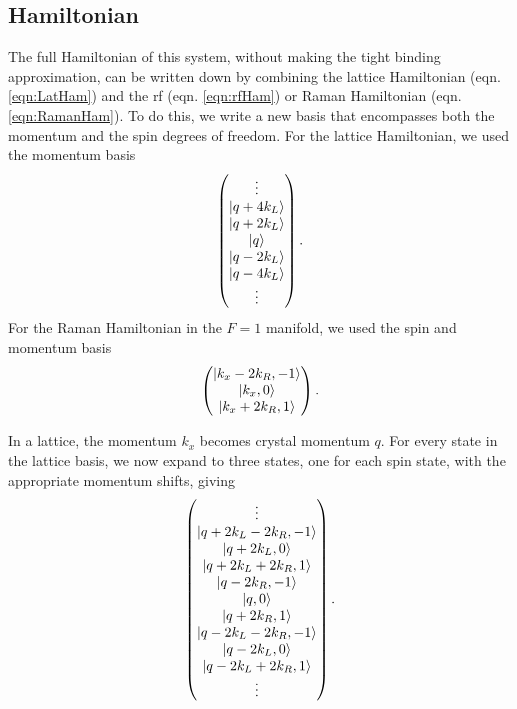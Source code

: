\subsection{Hamiltonian}\label{sec:SynDimHamiltonian}
The full Hamiltonian of this system, without making the tight binding approximation, can be written down by combining the lattice Hamiltonian (eqn. \ref{eqn:LatHam}) and the rf (eqn. \ref{eqn:rfHam}) or Raman Hamiltonian (eqn. \ref{eqn:RamanHam}). To do this, we write a new basis that encompasses both the momentum and the spin degrees of freedom. For the lattice Hamiltonian, we used the momentum basis
\begin{equation}
 \begin{pmatrix} \vdots \\
\mathinner{|{q+4 k_L}\rangle}\\
\mathinner{|{q+2 k_L}\rangle}\\
\mathinner{|{q}\rangle}\\
\mathinner{|{q -2 k_L}\rangle}\\
\mathinner{|{q - 4 k_L}\rangle}\\
\vdots
\end{pmatrix} \\.
\end{equation}
For the Raman Hamiltonian in the $F=1$ manifold, we used the spin and momentum basis
\begin{equation}
\begin{pmatrix}
\mathinner{|{k_x-2k_R,-1}\rangle}\\
 \mathinner{|{k_x,0}\rangle}\\
\mathinner{|{k_x+2k_R,1}\rangle}
\end{pmatrix}\\.
\end{equation}

In a lattice, the momentum $k_x$ becomes crystal momentum $q$. For every state in the lattice basis, we now expand to three states, one for each spin state, with the appropriate momentum shifts, giving
\begin{equation}
 \begin{pmatrix} \vdots \\
\mathinner{|{q+2k_L-2k_R,-1}\rangle}\\
 \mathinner{|{q+2k_L,0}\rangle}\\
\mathinner{|{q+2k_L+2k_R,1}\rangle}\\
\mathinner{|{q-2k_R,-1}\rangle}\\
 \mathinner{|{q,0}\rangle}\\
\mathinner{|{q+2k_R,1}\rangle}\\
\mathinner{|{q-2k_L-2k_R,-1}\rangle}\\
 \mathinner{|{q-2k_L,0}\rangle}\\
\mathinner{|{q-2k_L+2k_R,1}\rangle}\\
\vdots
\end{pmatrix} \\.
\end{equation}

